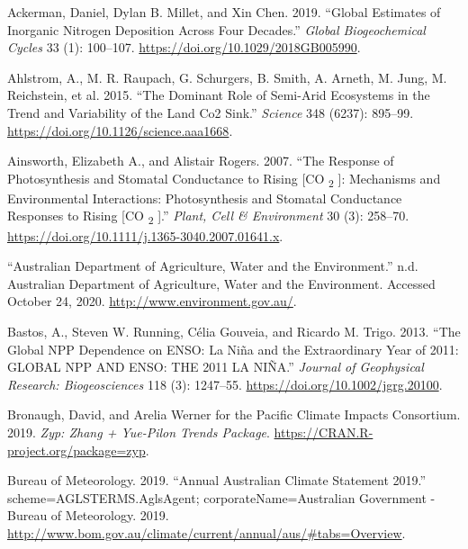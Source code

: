 \documentclass[
]{article}
\newlength{\cslhangindent}
\newlength{\cslentryspacingunit} %
\newenvironment{CSLReferences}[2] %
 {%
  \setlength{\parindent}{0pt}
  \ifodd #1
  \let\oldpar\par
  \def\par{\hangindent=\cslhangindent\oldpar}
  \fi
  \setlength{\parskip}{#2\cslentryspacingunit}
 }%
 {}
\begin{document}
\hypertarget{refs}{}
\begin{CSLReferences}{1}{0}
\leavevmode{}%
Ackerman, Daniel, Dylan B. Millet, and Xin Chen. 2019. {``Global
{Estimates} of {Inorganic Nitrogen Deposition Across Four Decades}.''}
\emph{Global Biogeochemical Cycles} 33 (1): 100--107.
\url{https://doi.org/10.1029/2018GB005990}.

\leavevmode{}%
Ahlstrom, A., M. R. Raupach, G. Schurgers, B. Smith, A. Arneth, M. Jung,
M. Reichstein, et al. 2015. {``The Dominant Role of Semi-Arid Ecosystems
in the Trend and Variability of the Land {Co2} Sink.''} \emph{Science}
348 (6237): 895--99. \url{https://doi.org/10.1126/science.aaa1668}.

\leavevmode{}%
Ainsworth, Elizabeth A., and Alistair Rogers. 2007. {``The Response of
Photosynthesis and Stomatal Conductance to Rising {[}{CO}
{\textsubscript{2}} {]}: Mechanisms and Environmental Interactions:
{Photosynthesis} and Stomatal Conductance Responses to Rising {[}{CO}
{\textsubscript{2}} {]}.''} \emph{Plant, Cell \& Environment} 30 (3):
258--70. \url{https://doi.org/10.1111/j.1365-3040.2007.01641.x}.

\leavevmode{}%
{``Australian Department of {Agriculture}, {Water} and the
{Environment}.''} n.d. {Australian Department of Agriculture, Water and
the Environment}. Accessed October 24, 2020.
\url{http://www.environment.gov.au/}.

\leavevmode{}%
Bastos, A., Steven W. Running, Célia Gouveia, and Ricardo M. Trigo.
2013. {``The Global {NPP} Dependence on {ENSO}: {La Niña} and the
Extraordinary Year of 2011: {GLOBAL NPP AND ENSO}: {THE} 2011 {LA
NIÑA}.''} \emph{Journal of Geophysical Research: Biogeosciences} 118
(3): 1247--55. \url{https://doi.org/10.1002/jgrg.20100}.

\leavevmode{}%
Bronaugh, David, and Arelia Werner for the Pacific Climate Impacts
Consortium. 2019. \emph{Zyp: {Zhang} + {Yue}-{Pilon Trends Package}}.
\url{https://CRAN.R-project.org/package=zyp}.

\leavevmode{}%
Bureau of Meteorology. 2019. {``Annual {Australian Climate Statement}
2019.''} {scheme=AGLSTERMS.AglsAgent; corporateName=Australian
Government - Bureau of Meteorology}. 2019.
\url{http://www.bom.gov.au/climate/current/annual/aus/\#tabs=Overview}.


\end{CSLReferences}
\end{document}
